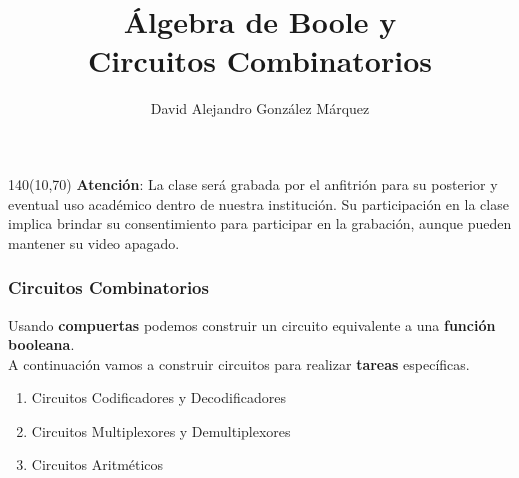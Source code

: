\documentclass[aspectratio=169]{beamer}
\title{\Huge Álgebra de Boole y\\ Circuitos Combinatorios}
\author{David Alejandro González Márquez}
\date{}
\begin{document}
\begin{frame}[plain]
    \titlepage
    \begin{textblock}{140}(10,70)
    \textcolor{rojo}{
    \textbf{Atención}: La clase será grabada por el anfitrión para su posterior y eventual uso académico dentro de nuestra institución. Su participación en la clase implica brindar su consentimiento para participar en la grabación, aunque pueden mantener su video apagado.}
    \end{textblock}
\end{frame}

\begin{frame}[fragile]
    \frametitle{Circuitos Combinatorios}
    Usando \textbf{compuertas} podemos construir un circuito equivalente a una \textbf{función booleana}.\\
    \bigskip
    A continuación vamos a construir circuitos para realizar \textbf{tareas} específicas.\\
    \bigskip
    \begin{enumerate}
     \item Circuitos Codificadores y Decodificadores
     \item Circuitos Multiplexores y Demultiplexores
     \item Circuitos Aritméticos
    \end{enumerate}
\end{frame}
\end{document}
